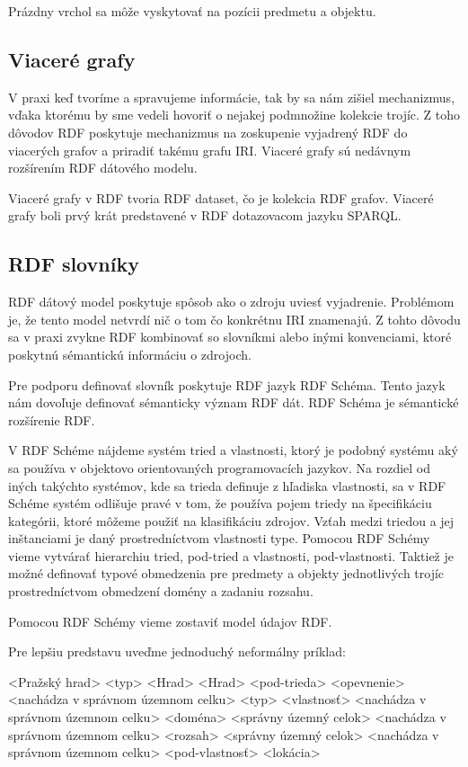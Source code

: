 Prázdny vrchol sa môže vyskytovať na pozícii predmetu a objektu.

\subsection{Viaceré grafy}
V praxi keď tvoríme a spravujeme informácie, tak by sa nám zišiel mechanizmus, vďaka ktorému by
sme vedeli hovoriť o nejakej podmnožine kolekcie trojíc. Z toho dôvodov RDF poskytuje mechanizmus
na zoskupenie vyjadrený RDF do viacerých grafov a priradiť takému grafu IRI. Viaceré grafy sú nedávnym
rozšírením RDF dátového modelu.

Viaceré grafy v RDF tvoria RDF dataset, čo je kolekcia RDF grafov.
Viaceré grafy boli prvý krát predstavené v RDF dotazovacom jazyku SPARQL.

\subsection{RDF slovníky}
RDF dátový model poskytuje spôsob ako o zdroju uviesť vyjadrenie.
Problémom je, že tento model netvrdí nič o tom čo konkrétnu IRI znamenajú. Z tohto dôvodu
sa v praxi zvykne RDF kombinovať so slovníkmi alebo inými konvenciami, ktoré poskytnú
sémantickú informáciu o zdrojoch.

Pre podporu definovať slovník poskytuje RDF jazyk RDF Schéma.
Tento jazyk nám dovoľuje definovať sémanticky význam RDF dát.
RDF Schéma je sémantické rozšírenie RDF.

V RDF Schéme nájdeme systém tried a vlastnosti, ktorý je podobný systému aký sa používa v objektovo
orientovaných programovacích jazykov. Na rozdiel od iných takýchto
systémov, kde sa trieda definuje z hľadiska vlastnosti, sa
v RDF Schéme systém odlišuje pravé v tom, že používa pojem triedy na špecifikáciu kategórii, ktoré môžeme
použiť na klasifikáciu zdrojov. Vzťah medzi triedou a jej inštanciami je daný prostredníctvom vlastnosti type.
Pomocou RDF Schémy vieme vytvárať hierarchiu tried, pod-tried a vlastnosti, pod-vlastnosti.
Taktiež je možné definovať typové obmedzenia pre predmety a objekty jednotlivých trojíc prostredníctvom
obmedzení domény a zadaniu rozsahu.

Pomocou RDF Schémy vieme zostaviť model údajov RDF.

Pre lepšiu predstavu uveďme jednoduchý neformálny príklad:
\begin{code}
    <Pražský hrad> <typ> <Hrad>
    <Hrad> <pod-trieda> <opevnenie>
    <nachádza v správnom územnom celku> <typ> <vlastnosť>
    <nachádza v správnom územnom celku> <doména> <správny územný celok>
    <nachádza v správnom územnom celku> <rozsah> <správny územný celok>
    <nachádza v správnom územnom celku> <pod-vlastnosť> <lokácia>
\end{code}



